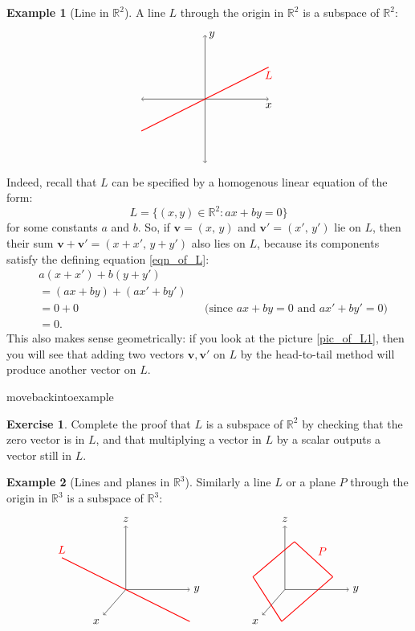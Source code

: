\documentclass[a4paper,11pt]{book}
\theoremstyle{definition}
\newtheorem{exercise}{Exercise}
\newtheorem{example_environment}{Example}[chapter]
\newcommand{\be}{\begin{equation}}
\newcommand{\ee}{\end{equation}}
\newcommand{\ba}{\begin{aligned}}
\newcommand{\ea}{\end{aligned}}
\newcommand{\ve}[1]{\mathbf{#1}}
\newenvironment{example}
	{
		\begin{oframed} 
		\begin{example_environment}
	}
	{
		\end{example_environment}
		\end{oframed}
	}
\begin{document}
\begin{example}[Line in $\mathbb{R}^2$] A line $L$ through the origin in $\mathbb{R}^2$ is a subspace of $\mathbb{R}^2$:
\be \label{pic_of_L1}
\ba
\begin{tikzpicture}
	\draw[<->] (-2, 0) -- (2,0) node[below] {$x$};
	\draw[<->] (0, -2) -- (0, 2) node[right] {$y$};
	\draw[thick, red] (-2, -1) -- (2, 1) node[below] {$L$};
\end{tikzpicture}
\ea
\ee
Indeed, recall that $L$ can be specified by a homogenous linear equation of the form:
\be \label{eqn_of_L}
 L = \{ (x,y) \in \mathbb{R}^2 : ax + by = 0 \}
\ee
for some constants $a$ and $b$. So, if $\ve{v} = (x, \, y)$ and $\ve{v}' = (x', \, y')$ lie on $L$, then their sum $\ve{v} + \ve{v}' = (x + x', \, y + y')$ also lies on $L$, because its components satisfy the defining equation \eqref{eqn_of_L}:
\begin{align*}
 &a(x + x') + b (y + y')\\
 & = (ax + by) + (ax' + by') \\
 &= 0 + 0 && \mbox{(since $ax + by = 0$ and $ax' + by' = 0$)} \\
 &= 0.
\end{align*}
This also makes sense geometrically: if you look at the picture \eqref{pic_of_L1}, then you will see that adding two vectors $\ve{v}, \ve{v}'$ on $L$ by the head-to-tail method will produce another vector on $L$.  

\end{example}
movebackintoexample
\begin{exercise} Complete the proof that $L$ is a subspace of $\mathbb{R}^2$ by checking that the zero vector is in $L$, and that multiplying a vector in $L$ by a scalar outputs a vector still in $L$.
\end{exercise}


\begin{example}[Lines and planes in $\mathbb{R}^3$] Similarly a line $L$ or a plane $P$ through the origin in $\mathbb{R}^3$ is a subspace of $\mathbb{R}^3$:
\be \label{pic_of_L}
\ba
\begin{tikzpicture}
 	\draw[->] (0, 0) -- (2,0) node[right] {$y$};
	\draw[->] (0, 0) -- (0, 2) node[above] {$z$};
	\draw[->] (0,0) -- (-0.7, -0.8) node[below left] {$x$};
	\draw[thick, red] (-2, 1) node[above] {$L$} -- (2, -1);
\end{tikzpicture}
\ea
\qquad \qquad
\ba
\begin{tikzpicture}
 	\draw[->] (0, 0) -- (2,0) node[right] {$y$};
	\draw[->] (0, 0) -- (0, 2) node[above] {$z$};
	\draw[->] (0,0) -- (-0.7, -0.8) node[below left] {$x$};
	\draw[thick, red] (-0.1, -1) -- (-1, 0.4);
	\draw[thick, red] (-1, 0.4) -- (0.3, 1.5);
	\draw[thick, red] (0.3, 1.5) -- node[above right] {$P$} (1.5, 0.4);
	\draw[thick, red] (1.5, 0.4) -- (-0.1, -1);
\end{tikzpicture}
\ea
\ee

\end{example}
\end{document}
